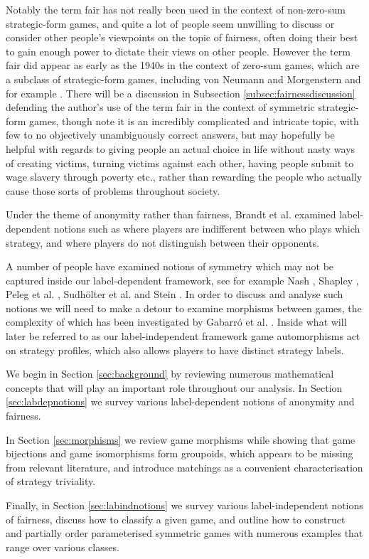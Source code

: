 Notably the term fair has not really been used in the context of non-zero-sum strategic-form games, and quite a lot of people seem unwilling to discuss or consider other people's viewpoints on the topic of fairness, often doing their best to gain enough power to dictate their views on other people. However the term fair did appear as early as the 1940s in the context of zero-sum games, which are a subclass of strategic-form games, including von Neumann and Morgenstern \cite[17.11, 28.1, 28.2]{VNM} and for example \cite{gelbaum1959symmetric, tucker1962comb}. There will be a discussion in Subsection \ref{subsec:fairnessdiscussion} defending the author's use of the term fair in the context of symmetric strategic-form games, though note it is an incredibly complicated and intricate topic, with few to no objectively unambiguously correct answers, but may hopefully be helpful with regards to giving people an actual choice in life without nasty ways of creating victims, turning victims against each other, having people submit to wage slavery through poverty etc., rather than rewarding the people who actually cause those sorts of problems throughout society.

Under the theme of anonymity rather than fairness, Brandt et al. \cite{brandt2009symmetries} examined label-dependent notions such as where players are indifferent between who plays which strategy, and where players do not distinguish between their opponents.

A number of people have examined notions of symmetry which may not be captured inside our label-dependent framework, see for example Nash \cite{NashNCG}, Shapley \cite{shapley1960symmetric}, Peleg et al. \cite{peleg1999canonical}, Sudh\"{o}lter et al. \cite{sudholter2000canonical} and Stein \cite{NoahXE}. In order to discuss and analyse such notions we will need to make a detour to examine morphisms between games, the complexity of which has been investigated by Gabarr\'{o} et al. \cite{IsoComplexity}. Inside what will later be referred to as our label-independent framework game automorphisms act on strategy profiles, which also allows players to have distinct strategy labels.

We begin in Section \ref{sec:background} by reviewing numerous mathematical concepts that will play an important role throughout our analysis. In Section \ref{sec:labdepnotions} we survey various label-dependent notions of anonymity and fairness. 

In Section \ref{sec:morphisms} we review game morphisms while showing that game bijections and game isomorphisms form groupoids, which appears to be missing from relevant literature, and introduce matchings as a convenient characterisation of strategy triviality. 

Finally, in Section \ref{sec:labindnotions} we survey various label-independent notions of fairness, discuss how to classify a given game, and outline how to construct and partially order parameterised symmetric games with numerous examples that range over various classes.

